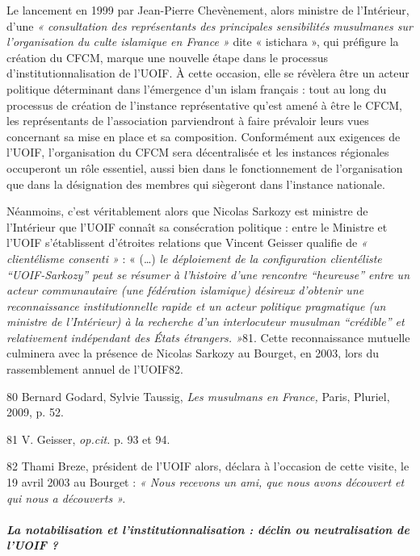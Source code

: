 Le lancement en 1999 par Jean-Pierre Chevènement, alors ministre de
l'Intérieur, d'une \emph{« consultation des représentants des
principales sensibilités musulmanes sur l'organisation du culte
islamique en France »} dite « istichara », qui préfigure la création du
CFCM, marque une nouvelle étape dans le processus
d'institutionnalisation de l'UOIF. À cette occasion, elle se révèlera
être un acteur politique déterminant dans l'émergence d'un islam
français : tout au long du processus de création de l'instance
représentative qu'est amené à être le CFCM, les représentants de
l'association parviendront à faire prévaloir leurs vues concernant sa
mise en place et sa composition. Conformément aux exigences de l'UOIF,
l'organisation du CFCM sera décentralisée et les instances régionales
occuperont un rôle essentiel, aussi bien dans le fonctionnement de
l'organisation que dans la désignation des membres qui siègeront dans
l'instance nationale.

Néanmoins, c'est véritablement alors que Nicolas Sarkozy est ministre de
l'Intérieur que l'UOIF connaît sa consécration politique : entre le
Ministre et l'UOIF s'établissent d'étroites relations que Vincent
Geisser qualifie de \emph{« clientélisme consenti »} : « (\ldots)
\emph{le déploiement de la configuration clientéliste ``UOIF-Sarkozy''
peut se résumer à l'histoire d'une rencontre ``heureuse'' entre un
acteur communautaire (une fédération islamique) désireux d'obtenir une
reconnaissance institutionnelle rapide et un acteur politique
pragmatique (un ministre de l'Intérieur) à la recherche d'un
interlocuteur musulman ``crédible'' et relativement indépendant des
États étrangers. »}81. Cette reconnaissance mutuelle culminera avec la
présence de Nicolas Sarkozy au Bourget, en 2003, lors du rassemblement
annuel de l'UOIF82.

80 Bernard Godard, Sylvie Taussig, \emph{Les musulmans en France,}
Paris, Pluriel, 2009, p. 52.

81 V. Geisser, \emph{op.cit.} p. 93 et 94.

82 Thami Breze, président de l'UOIF alors, déclara à l'occasion de cette
visite, le 19 avril 2003 au Bourget : \emph{« Nous recevons un ami, que
nous avons découvert et qui nous a découverts ».}




\hypertarget{la-notabilisation-et-linstitutionnalisation-duxe9clin-ou-neutralisation-de-luoif}{%
\subparagraph{La notabilisation et l'institutionnalisation : déclin ou
neutralisation de l'UOIF
?}\label{la-notabilisation-et-linstitutionnalisation-duxe9clin-ou-neutralisation-de-luoif}}


